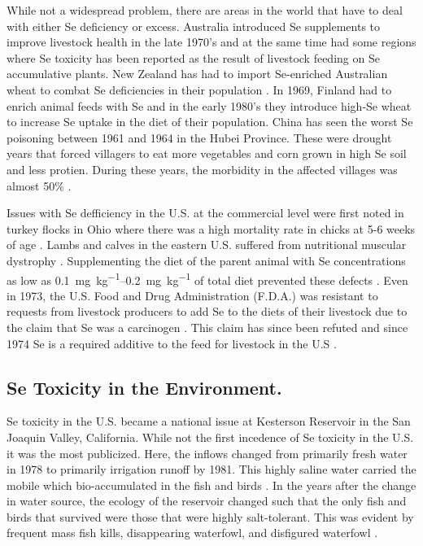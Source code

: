 \begin{linenumbers}[1]
While not a widespread problem, there are areas in the world that have to deal with either Se deficiency or excess.  Australia introduced Se supplements to improve livestock health in the late 1970's and at the same time had some regions where Se toxicity has been reported as the result of livestock feeding on Se accumulative plants.  New Zealand has had to import Se-enriched Australian wheat to combat Se deficiencies in their population \citep{1996Thomson,Tinggi2003}.  In 1969, Finland had to enrich animal feeds with Se and in the early 1980's they introduce high-Se wheat to increase Se uptake in the diet of their population.  China has seen the worst Se poisoning between 1961 and 1964 in the Hubei Province.  These were drought years that forced villagers to eat more vegetables and corn grown in high Se soil and less protien.  During these years, the morbidity in the affected villages was almost 50\% \citep{yang1983}.

Issues with Se defficiency in the U.S. at the commercial level were first noted in turkey flocks in Ohio where there was a high mortality rate in chicks at 5-6 weeks of age \citep{scott1967}.  Lambs and calves in the eastern U.S. suffered from nutritional muscular dystrophy .  Supplementing the diet of the parent animal with Se concentrations as low as \SIrange{0.1}{0.2}{\milli\gram\per\kilo\gram} of total diet prevented these defects .  Even in 1973, the U.S. Food and Drug Administration (F.D.A.) was resistant to requests from livestock producers to add Se to the diets of their livestock due to the claim that Se was a carcinogen \citep{scott1973}.  This claim has since been refuted and since 1974 Se is a required additive to the feed for livestock in the U.S \citep{1999Jensen}.

\subsection*{Se Toxicity in the Environment.}
Se toxicity in the U.S. became a national issue at Kesterson Reservoir in the San Joaquin Valley, California.  While not the first incedence of Se toxicity in the U.S. it was the most publicized.  Here, the inflows changed from primarily fresh water in 1978 to primarily irrigation runoff by 1981.  This highly saline water carried the mobile \selenate which bio-accumulated in the fish and birds \citep{Besser1989}.  In the years after the change in water source, the ecology of the reservoir changed such that the only fish and birds that survived were those that were highly salt-tolerant.  This was evident by frequent mass fish kills, disappearing waterfowl, and disfigured waterfowl \citep{Clifton1989,Saiki1993,Hamilton1999,Lemly2002}.


\end{linenumbers}
